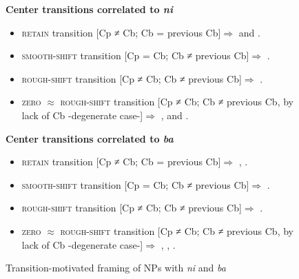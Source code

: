\documentclass[output=paper
,modfonts
,nonflat]{langsci/langscibook}
\begin{document}
\begin{figure}[t] 
	\centering 
	\caption{Transition-motivated framing of NPs with \textit{ni} and \textit{ba}} 
	\label{fig:pico:3}
	\textbf{Center transitions correlated to \textit{ni}}
	\begin{itemize} 
		
		\item \textsc{retain} transition [Cp ≠ Cb; Cb = previous Cb]$\Rightarrow$  and .
		
		\item \textsc{smooth-shift} transition [Cp = Cb; Cb ≠ previous Cb]$\Rightarrow$  .
		
		\item \textsc{rough-shift} transition [Cp ≠ Cb; Cb ≠ previous Cb]$\Rightarrow$  .
		
		\item \textsc{zero} $\approx$ \textsc{rough-shift} transition [Cp ≠ Cb; Cb ≠ previous Cb, by lack of Cb -degenerate case-]$\Rightarrow$ ,  and .
		
	\end{itemize}
	
	
	
	\textbf{Center transitions correlated to \textit{ba}}
	\begin{itemize}
		
		\item \textsc{retain} transition [Cp ≠ Cb; Cb = previous Cb]$\Rightarrow$ , .
		
		\item \textsc{smooth-shift} transition [Cp = Cb; Cb ≠ previous Cb]$\Rightarrow$ .
		
		\item \textsc{rough-shift} transition [Cp ≠ Cb; Cb ≠ previous Cb]$\Rightarrow$ .
		
		\item \textsc{zero} $\approx$ \textsc{rough-shift} transition [Cp ≠ Cb; Cb ≠ previous Cb, by lack of Cb -degenerate case-]$\Rightarrow$ , , .
	\end{itemize}
\end{figure}
\end{document}
